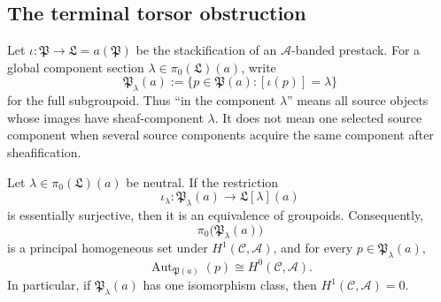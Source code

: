 \subsection*{The terminal torsor obstruction}

Let \(\iota:\mathfrak P\to\mathfrak L=a(\mathfrak P)\) be the
stackification of an \(\mathscr A\)-banded prestack.  For a global component
section \(\lambda\in\pi_0(\mathfrak L)(a)\), write
\begin{equation}\label{eq:full-source-component-fibre}
 \mathfrak P_\lambda(a)
 :=\{p\in\mathfrak P(a):[\iota(p)]=\lambda\}
\end{equation}
for the full subgroupoid.  Thus ``in the component \(\lambda\)'' means all
source objects whose images have sheaf-component \(\lambda\).  It does not
mean one selected source component when several source components acquire
the same component after sheafification.

\begin{theorem}
\label{thm:terminal-torsor-obstruction}
Let \(\lambda\in\pi_0(\mathfrak L)(a)\) be neutral.  If the restriction
\[
 \iota_\lambda:\mathfrak P_\lambda(a)
 \longrightarrow \mathfrak L[\lambda](a)
\]
is essentially surjective, then it is an equivalence of groupoids.
Consequently,
\[
 \pi_0\bigl(\mathfrak P_\lambda(a)\bigr)
\]
is a principal homogeneous set under \(H^1(\mathcal C,\mathscr A)\), and
for every \(p\in\mathfrak P_\lambda(a)\),
\[
 \operatorname{Aut}_{\mathfrak P(a)}(p)
 \cong H^0(\mathcal C,\mathscr A).
\]
In particular, if \(\mathfrak P_\lambda(a)\) has one isomorphism class, then
\(H^1(\mathcal C,\mathscr A)=0\).
\end{theorem}

